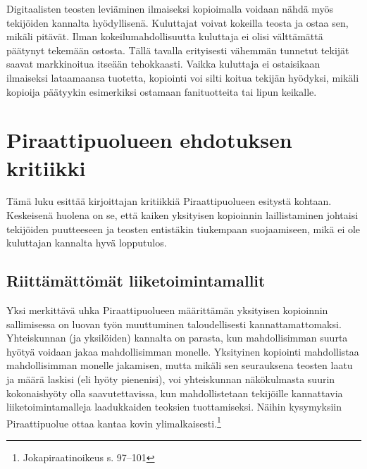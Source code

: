 \documentclass[titlepage,12pt]{article}
\begin{document}
Digitaalisten teosten leviäminen ilmaiseksi kopioimalla voidaan nähdä
myös tekijöiden kannalta hyödyllisenä.  Kuluttajat voivat kokeilla
teosta ja ostaa sen, mikäli pitävät.  Ilman kokeilumahdollisuutta
kuluttaja ei olisi välttämättä päätynyt tekemään ostosta.  Tällä
tavalla erityisesti vähemmän tunnetut tekijät saavat markkinoitua
itseään tehokkaasti.  Vaikka kuluttaja ei ostaisikaan ilmaiseksi
lataamaansa tuotetta, kopiointi voi silti koitua tekijän hyödyksi,
mikäli kopioija päätyykin esimerkiksi ostamaan fanituotteita tai lipun
keikalle.


\section{Piraattipuolueen ehdotuksen kritiikki}

Tämä luku esittää kirjoittajan kritiikkiä Piraattipuolueen esitystä
kohtaan.  Keskeisenä huolena on se, että kaiken yksityisen kopioinnin
laillistaminen johtaisi tekijöiden puutteeseen ja teosten entistäkin
tiukempaan suojaamiseen, mikä ei ole kuluttajan kannalta hyvä
lopputulos.

\subsection{Riittämättömät liiketoimintamallit}

Yksi merkittävä uhka Piraattipuolueen määrittämän yksityisen
kopioinnin sallimisessa on luovan työn muuttuminen taloudellisesti
kannattamattomaksi.  Yhteiskunnan (ja yksilöiden) kannalta on parasta,
kun mahdollisimman suurta hyötyä voidaan jakaa mahdollisimman monelle.
Yksityinen kopiointi mahdollistaa mahdollisimman monelle jakamisen,
mutta mikäli sen seurauksena teosten laatu ja määrä laskisi (eli hyöty
pienenisi), voi yhteiskunnan näkökulmasta suurin kokonaishyöty olla
saavutettavissa, kun mahdollistetaan tekijöille kannattavia
liiketoimintamalleja laadukkaiden teoksien tuottamiseksi.  Näihin
kysymyksiin Piraattipuolue ottaa kantaa kovin
ylimalkaisesti.\footnote{Jokapiraatinoikeus s. 97--101}


\end{document}
